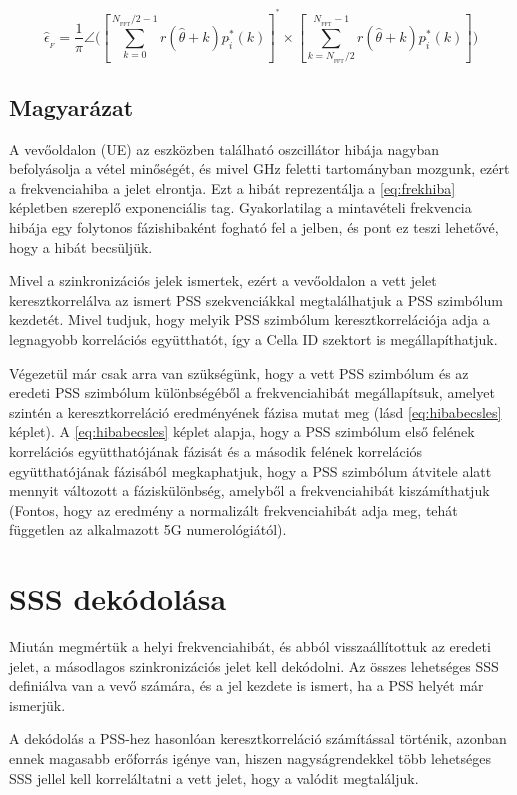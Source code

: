 \begin{equation}
    \hat {\epsilon }_{_{F}}=\frac {1}{\pi } \angle \Bigg (\left[{ \sum \limits _{k=0}^{N_{_{\text {FFT}}}/2-1}{r(\hat {\theta }+k) p_{\hat {i}}^{*}(k)}}\right]^{^{*}}  \times \left[{ \sum \limits _{k=N_{_{\text {FFT}}}/2}^{N_{_{\text {FFT}}}-1}{r(\hat {\theta }+k) p_{\hat {i}}^{*}(k)}}\right] \Bigg) \label{eq:hibabecsles}
\end{equation} 

\subsection{Magyarázat}

A vevőoldalon (UE) az eszközben található oszcillátor hibája nagyban befolyásolja a vétel minőségét, és mivel GHz feletti tartományban mozgunk, ezért a frekvenciahiba a jelet elrontja.
Ezt a hibát reprezentálja a \ref{eq:frekhiba} képletben szereplő exponenciális tag.
Gyakorlatilag a mintavételi frekvencia hibája egy folytonos fázishibaként fogható fel a jelben, és pont ez teszi lehetővé, hogy a hibát becsüljük.

Mivel a szinkronizációs jelek ismertek, ezért a vevőoldalon a vett jelet keresztkorrelálva az ismert PSS szekvenciákkal megtalálhatjuk a PSS szimbólum kezdetét.
Mivel tudjuk, hogy melyik PSS szimbólum keresztkorrelációja adja a legnagyobb korrelációs együtthatót, így a Cella ID szektort is megállapíthatjuk.

Végezetül már csak arra van szükségünk, hogy a vett PSS szimbólum és az eredeti PSS szimbólum különbségéből a frekvenciahibát megállapítsuk, amelyet szintén a keresztkorreláció eredményének fázisa mutat meg (lásd \ref{eq:hibabecsles} képlet).
A \ref{eq:hibabecsles} képlet alapja, hogy a PSS szimbólum első felének korrelációs együtthatójának fázisát és a második felének korrelációs  együtthatójának fázisából megkaphatjuk, hogy a PSS szimbólum átvitele alatt mennyit változott a fáziskülönbség, amelyből a frekvenciahibát kiszámíthatjuk (Fontos, hogy az eredmény a normalizált frekvenciahibát adja meg, tehát független az alkalmazott 5G numerológiától).

\section{SSS dekódolása}

Miután megmértük a helyi frekvenciahibát, és abból visszaállítottuk az eredeti jelet, a másodlagos szinkronizációs jelet kell dekódolni.
Az összes lehetséges SSS definiálva van a vevő számára, és a jel kezdete is ismert, ha a PSS helyét már ismerjük.

A dekódolás a PSS-hez hasonlóan keresztkorreláció számítással történik, azonban ennek magasabb erőforrás igénye van, hiszen nagyságrendekkel több lehetséges SSS jellel kell korreláltatni a vett jelet, hogy a valódit megtaláljuk.